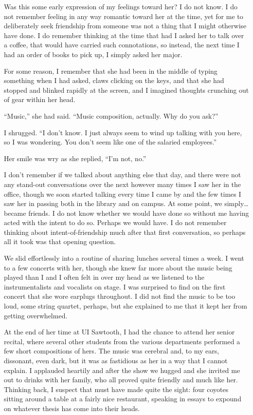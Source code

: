 Was this some early expression of my feelings toward her? I do not know. I do not remember feeling in any way romantic toward her at the time, yet for me to deliberately seek friendship from someone was not a thing that I might otherwise have done. I do remember thinking at the time that had I asked her to talk over a coffee, that would have carried such connotations, so instead, the next time I had an order of books to pick up, I simply asked her major.

For some reason, I remember that she had been in the middle of typing something when I had asked, claws clicking on the keys, and that she had stopped and blinked rapidly at the screen, and I imagined thoughts crunching out of gear within her head.

``Music,'' she had said. ``Music composition, actually. Why do you ask?''

I shrugged. ``I don't know. I just always seem to wind up talking with you here, so I was wondering. You don't seem like one of the salaried employees.''

Her smile was wry as she replied, ``I'm not, no.''

I don't remember if we talked about anything else that day, and there were not any stand-out conversations over the next however many times I saw her in the office, though we soon started talking every time I came by and the few times I saw her in passing both in the library and on campus. At some point, we simply\ldots became friends. I do not know whether we would have done so without me having acted with the intent to do so. Perhaps we would have. I do not remember thinking about intent-of-friendship much after that first conversation, so perhaps all it took was that opening question.

We slid effortlessly into a routine of sharing lunches several times a week. I went to a few concerts with her, though she knew far more about the music being played than I and I often felt in over my head as we listened to the instrumentalists and vocalists on stage. I was surprised to find on the first concert that she wore earplugs throughout. I did not find the music to be too loud, some string quartet, perhaps, but she explained to me that it kept her from getting overwhelmed.

At the end of her time at UI Sawtooth, I had the chance to attend her senior recital, where several other students from the various departments performed a few short compositions of hers. The music was cerebral and, to my ears, dissonant, even dark, but it was as fastidious as her in a way that I cannot explain. I applauded heartily and after the show we hugged and she invited me out to drinks with her family, who all proved quite friendly and much like her. Thinking back, I suspect that must have made quite the sight: four coyotes sitting around a table at a fairly nice restaurant, speaking in essays to expound on whatever thesis has come into their heads.

